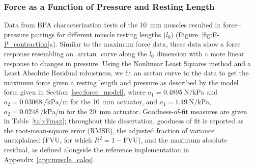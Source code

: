 \subsubsection{Force as a Function of Pressure and Resting Length}

Data from BPA characterization tests of the \qty{10}{\mm} muscles resulted in force--pressure pairings for different muscle resting lengths ($l_0$) (Figure~\ref{fig:F-P_contraction}a). Similar to the maximum force data, these data show a force response resembling an $\arctan$ curve along the $l_0$ dimension  with a more linear response to changes in pressure. Using the Nonlinear Least Squares method and a Least Absolute Residual robustness, we fit an arctan curve to the data to get the maximum force given a resting length and pressure as described by the model form given in Section~\ref{sec:force_model},
where $a_1 = \qty{0.4895}{\N\per\kPa}$  and $a_2=\qty{0.03068}{\per\kPa\per\m}$ for the \qty{10}{\mm} actuator, and \mbox{$a_1 = \qty{1.49}{\N\per\kPa}$,} $a_2=\qty{0.0248}{\per\kPa\per\m}$ for the \qty{20}{\mm} actuator. Goodness-of-fit measures are given in Table~\ref{tab:Fmax}; throughout this dissertation, goodness of fit is reported as the root-mean-square error (RMSE), the adjusted fraction of variance unexplained (FVU, for which $R^{2} = 1 - \mathrm{FVU}$), and the maximum absolute residual, as defined alongside the reference implementation in Appendix~\ref{app:muscle_calcs}. 



